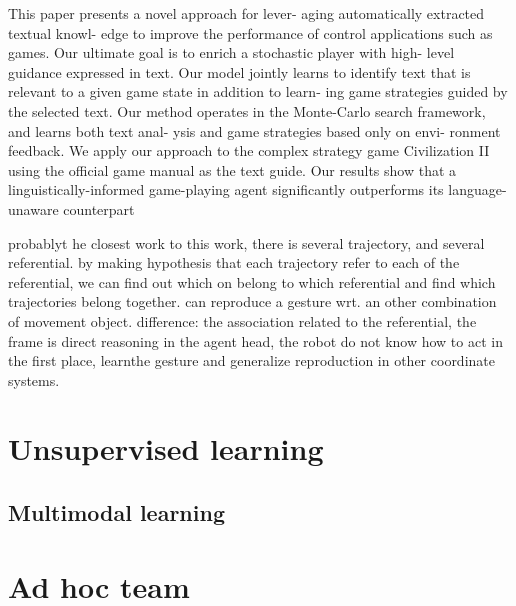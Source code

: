 \cite{branavan2011learning} This paper presents a novel approach for lever- aging automatically extracted textual knowl- edge to improve the performance of control applications such as games. Our ultimate goal is to enrich a stochastic player with high- level guidance expressed in text. Our model jointly learns to identify text that is relevant to a given game state in addition to learn- ing game strategies guided by the selected text. Our method operates in the Monte-Carlo search framework, and learns both text anal- ysis and game strategies based only on envi- ronment feedback. We apply our approach to the complex strategy game Civilization II using the official game manual as the text guide. Our results show that a linguistically-informed game-playing agent significantly outperforms its language-unaware counterpart

\cite{cederborg2011imitating} probablyt he closest work to this work, there is several trajectory, and several referential. by making hypothesis that each trajectory refer to each of the referential, we can find out which on belong to which referential and find which trajectories belong together. can reproduce a gesture wrt. an other combination of movement object. 
difference: the association related to the referential, the frame is direct reasoning in the agent head, the robot do not know how to act in the first place, learnthe gesture and generalize reproduction in other coordinate systems.


\section{Unsupervised learning}


\subsection{Multimodal learning}


\section{Ad hoc team}

